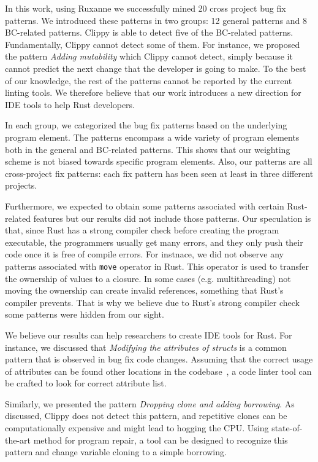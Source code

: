 In this work, using Ruxanne we successfully mined 20 cross project bug fix patterns. We introduced these patterns in two groups: 12 general patterns and 8 BC-related patterns. Clippy is able to detect five of the BC-related patterns. Fundamentally, Clippy cannot detect some of them. For instance, we proposed the pattern \textit{Adding mutability} which Clippy cannot detect, simply because it cannot predict the next change that the developer is going to make. To the best of our knowledge, the rest of the patterns cannot be reported by the current linting tools. We therefore believe that our work introduces a new direction for IDE tools to help Rust developers.

In each group, we categorized the bug fix patterns based on the underlying program element. The patterns encompass a wide variety of program elements both in the general and BC-related patterns. This shows that our weighting scheme is not biased towards specific program elements. Also, our patterns are all cross-project fix patterns: each fix pattern has been seen at least in three different projects.

Furthermore, we expected to obtain some patterns associated with certain Rust-related features but our results did not include those patterns. Our speculation is that, since Rust has a strong compiler check before creating the program executable, the programmers usually get many errors, and they only push their code once it is free of compile errors. For instnace, we did not observe any patterns associated with \verb+move+ operator in Rust. This operator is used to transfer the ownership of values to a closure. In some cases (e.g. multithreading) not moving the ownership can create invalid references, something that Rust's compiler prevents. That is why we believe due to Rust's strong compiler check some patterns were hidden from our sight.

We believe our results can help researchers to create IDE tools for Rust. For instance, we discussed that \textit{Modifying the attributes of structs} is a common pattern that is observed in bug fix code changes. Assuming that the correct usage of attributes can be found other locations in the codebase~\citep{forrest2009genetic}, a code linter tool can be crafted to look for correct attribute list.

Similarly, we presented the pattern \textit{Dropping clone and adding borrowing}. As discussed, Clippy does not detect this pattern, and repetitive clones can be computationally expensive and might lead to hogging the CPU. Using state-of-the-art method for program repair, a tool can be designed to recognize this pattern and change variable cloning to a simple borrowing.

